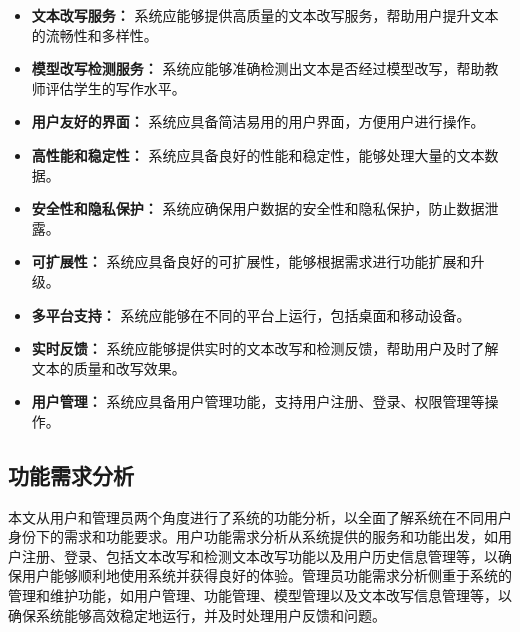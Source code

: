 \begin{itemize}
    \item \textbf{文本改写服务：} 系统应能够提供高质量的文本改写服务，帮助用户提升文本的流畅性和多样性。
    \item \textbf{模型改写检测服务：} 系统应能够准确检测出文本是否经过模型改写，帮助教师评估学生的写作水平。
    \item \textbf{用户友好的界面：} 系统应具备简洁易用的用户界面，方便用户进行操作。
    \item \textbf{高性能和稳定性：} 系统应具备良好的性能和稳定性，能够处理大量的文本数据。
    \item \textbf{安全性和隐私保护：} 系统应确保用户数据的安全性和隐私保护，防止数据泄露。
    \item \textbf{可扩展性：} 系统应具备良好的可扩展性，能够根据需求进行功能扩展和升级。
    \item \textbf{多平台支持：} 系统应能够在不同的平台上运行，包括桌面和移动设备。
    \item \textbf{实时反馈：} 系统应能够提供实时的文本改写和检测反馈，帮助用户及时了解文本的质量和改写效果。
    \item \textbf{用户管理：} 系统应具备用户管理功能，支持用户注册、登录、权限管理等操作。
\end{itemize}

\subsection{功能需求分析}
\label{sec:sys-func-need}

本文从用户和管理员两个角度进行了系统的功能分析，以全面了解系统在不同用户身份下的需求和功能要求。用户功能需求分析从系统提供的服务和功能出发，如用户注册、登录、包括文本改写和检测文本改写功能以及用户历史信息管理等，以确保用户能够顺利地使用系统并获得良好的体验。管理员功能需求分析侧重于系统的管理和维护功能，如用户管理、功能管理、模型管理以及文本改写信息管理等，以确保系统能够高效稳定地运行，并及时处理用户反馈和问题。

